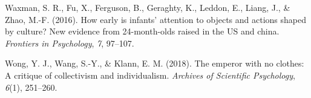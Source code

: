 \documentclass[10pt, letterpaper]{article}
\newenvironment{CSLReferences}%
  {}%
  {\par}
\begin{document}
\begin{CSLReferences}{1}{0}
\leavevmode{}%
Waxman, S. R., Fu, X., Ferguson, B., Geraghty, K., Leddon, E., Liang,
J., \& Zhao, M.-F. (2016). How early is infants' attention to objects
and actions shaped by culture? New evidence from 24-month-olds raised in
the US and china. \emph{Frontiers in Psychology}, \emph{7}, 97--107.

\leavevmode{}%
Wong, Y. J., Wang, S.-Y., \& Klann, E. M. (2018). The emperor with no
clothes: A critique of collectivism and individualism. \emph{Archives of
Scientific Psychology}, \emph{6}(1), 251--260.

\end{CSLReferences}


\end{document}
